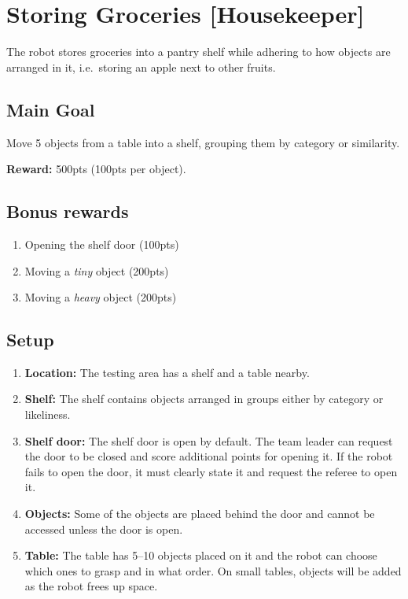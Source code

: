 \section{Storing Groceries [Housekeeper]}
\label{test:storing-groceries}
The robot stores groceries into a pantry shelf while adhering to how objects are arranged in it, i.e.~storing an apple next to other fruits.


\subsection*{Main Goal}
Move 5 objects from a table into a shelf, grouping them by category or similarity.

\noindent\textbf{Reward:} 500pts (100pts per object).\\

\subsection*{Bonus rewards}
\begin{enumerate}[nosep]
	\item Opening the shelf door (100pts)
	\item Moving a \emph{tiny} object (200pts)
	\item Moving a \emph{heavy} object (200pts)
\end{enumerate}

%
%
\subsection*{Setup}
\begin{enumerate}
	\item \textbf{Location:} The testing area has a shelf and a table nearby.

	\item \textbf{Shelf:} The shelf contains objects arranged in groups either by category or likeliness.

	\item \textbf{Shelf door:} The shelf door is open by default.
	The team leader can request the door to be closed and score additional points for opening it. If the robot fails to open the door, it must clearly state it and request the referee to open it.

	\item \textbf{Objects:} Some of the objects are placed behind the door and cannot be accessed unless the door is open.

	\item \textbf{Table:} The table has 5--10 objects placed on it and the robot can choose which ones to grasp and in what order. On small tables, objects will be added as the robot frees up space.
\end{enumerate}



